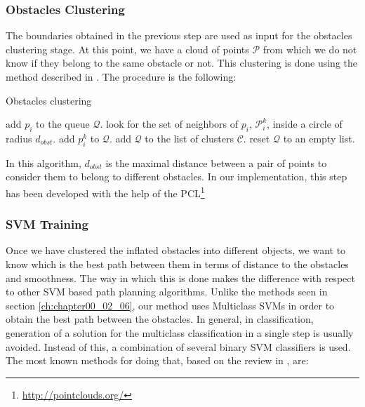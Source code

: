 \subsubsection{Obstacles Clustering}\label{ch:chapter06_01_01_02}

The boundaries obtained in the previous step are used as input for the obstacles clustering stage. At this point, we have a cloud of points $\mathcal{P}$ from which we do not know if they belong to the same obstacle or not. This clustering is done using the method described in \cite{rusu2009semantic}. The procedure is the following:

\begin{algorithm}
\caption{Obstacles clustering}
\label{alg:obstacles_clustering}
\begin{algorithmic}
  \State add $p_i$ to the queue $\mathcal{Q}$.
    \State look for the set of neighbors of $p_i$, $\mathcal{P}_i^k$, inside a circle of radius $d_{obst}$.
	\State add $p_i^k$ to $\mathcal{Q}$.
      \EndIf
    \EndFor
      \State add $\mathcal{Q}$ to the list of clusters $\mathcal{C}$.
      \State reset $\mathcal{Q}$ to an empty list.
    \EndIf
  \EndFor
\EndFor
\end{algorithmic}
\end{algorithm}

In this algorithm, $d_{obst}$ is the maximal distance between a pair of points to consider them to belong to different obstacles. In our implementation, this step has been developed with the help of the \acf{PCL}\footnote{\url{http://pointclouds.org/}}

\subsubsection{\ac{SVM} Training}\label{ch:chapter06_01_01_03}

Once we have clustered the inflated obstacles into different objects, we want to know which is the best path between them in terms of distance to the obstacles and smoothness. The way in which this is done makes the difference with respect to other \ac{SVM} based path planning algorithms. Unlike the methods seen in section \ref{ch:chapter00_02_06}, our method uses Multiclass \acp{SVM} in order to obtain the best path between the obstacles. In general, in classification, generation of a solution for the multiclass classification in a single step is usually avoided. Instead of this, a combination of several binary \ac{SVM} classifiers is used. The most known methods for doing that, based on the review in \cite{hsu2002comparison, duan2005best}, are:

